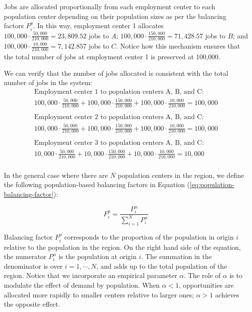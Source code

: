 \documentclass[10pt,letterpaper]{article}
\begin{document}
Jobs are allocated proportionally from each employment center to each
population center depending on their population sizes as per the
balancing factors \(F^p_i\). In this way, employment center 1 allocates
\(100,000\cdot \frac{50,000}{210,000}= 23,809.52\) jobs to \(A\);
\(100,000\cdot \frac{150,000}{210,000}= 71,428.57\) jobs to \(B\); and
\(100,000\cdot \frac{10,000}{210,000}= 7,142.857\) jobs to \(C\). Notice
how this mechanism ensures that the total number of jobs at employment
center 1 is preserved at 100,000.

We can verify that the number of jobs allocated is consistent with the
total number of jobs in the system: \[
\begin{array}{l}
\text{Employment center 1 to population centers A, B, and C: }\\
100,000 \cdot \frac{50,000}{210,000} + 100,000 \cdot \frac{150,000}{210,000} + 100,000 \cdot \frac{10,000}{210,000} = 100,000\\
\\
\text{Employment center 2 to population centers A, B, and C: }\\
100,000 \cdot \frac{50,000}{210,000} + 100,000 \cdot \frac{150,000}{210,000} + 100,000 \cdot \frac{10,000}{210,000} = 100,000\\
\\
\text{Employment center 3 to population centers A, B, and C: }\\
10,000 \cdot \frac{50,000}{210,000} + 10,000 \cdot \frac{150,000}{210,000} + 10,000 \cdot \frac{10,000}{210,000} = 10,000\\
\end{array}
\]

In the general case where there are \(N\) population centers in the
region, we define the following population-based balancing factors in
Equation (\ref{eq:population-balancing-factor}):

\begin{equation}
\label{eq:population-balancing-factor}
F^p_{i} = \frac{P_{i}^\alpha}{\sum_{i=1}^N P_{i}^\alpha}
\end{equation}

Balancing factor \(F^p_{i}\) corresponds to the proportion of the
population in origin \(i\) relative to the population in the region. On
the right hand side of the equation, the numerator \(P_{i}^\alpha\) is
the population at origin \(i\). The summation in the denominator is over
\(i=1,\cdots,N\), and adds up to the total population of the region.
Notice that we incorporate an empirical parameter \(\alpha\). The role
of \(\alpha\) is to modulate the effect of demand by population. When
\(\alpha <1\), opportunities are allocated more rapidly to smaller
centers relative to larger ones; \(\alpha>1\) achieves the opposite
effect.
\end{document}
